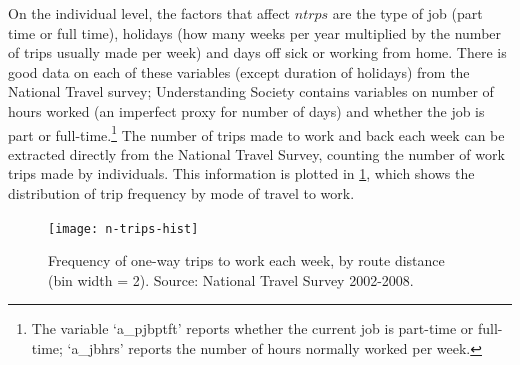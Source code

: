 On the individual level, the factors that affect
$ntrps$ are the type of job (part time or full time), holidays
(how many weeks per year multiplied by the number of trips usually made per week)
and days off sick or working from home. There is good data on each of these
variables (except duration of holidays) from the National Travel survey;
Understanding Society contains variables on number of hours worked
(an imperfect proxy for number of days) and whether the job is part or
full-time.\footnote{The variable
`a\_pjbptft' reports whether the current job is part-time or full-time;
`a\_jbhrs' reports the number of hours normally worked per week.
}
The number of trips made to
work and back each week can be extracted directly from the National Travel
Survey, counting the number of work trips made by individuals.
This information is plotted in \cref{fn-trips-hist}, which shows the distribution
of trip frequency by mode of travel to work.

\begin{figure}[h]
  \centerline{
    \texttt{[image: n-trips-hist]}}
  \caption[Frequency of trips to work each week, by distance]
  {Frequency of one-way trips to work each week, by route distance (bin
  width = 2). Source:
  National Travel Survey 2002-2008.}
  \label{fn-trips-hist}
\end{figure}

